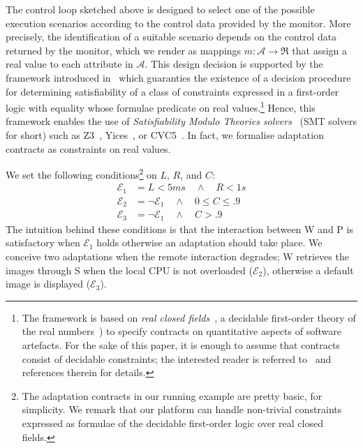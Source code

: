 The control loop sketched above is designed to select one of the
possible execution scenarios according to the control data provided by
the monitor.
%
More precisely, the identification of a suitable scenario depends on the
control data returned by the monitor, which we render as
mappings $m : \mathcal{A} \to \Re$ that assign a real value to each
attribute in $\mathcal A$.
%
%
This design decision is supported by the framework introduced
in~\cite{lopezpombo:tcs-1043,lopezpombo:ictac23} which guaranties the
existence of a decision procedure for determining satisfiability of a
class of constraints expressed in a first-order logic with
equality whose formulae predicate on real values.\footnote{%
  The framework is based on \emph{real closed fields}~\cite{tarski51},
  a decidable first-order theory of the real
  numbers~\cite[Theorem~37]{tarski51}) to specify contracts on
  quantitative aspects of software artefacts.
  For the sake of this paper, it is enough to assume that contracts
  consist of decidable constraints; the interested reader is referred
  to~\cite{lopezpombo:tcs-1043,lopezpombo:ictac23} and references
  therein for details.
}
%
Hence, this framework enables the use of \emph{Satisfiability Modulo
  Theories solvers}~\cite{biere21} (SMT solvers for short) such as
Z3~\cite{demoura:tacas08}, Yices~\cite{dutertre:cav14}, or
CVC5~\cite{barbosa:tacas22}.
% 
In fact, we formalise adaptation contracts as constraints on real
values.
%
\begin{example}\label{exe:contract}
We set the following conditions\footnote{%
  The adaptation contracts in our running example are pretty basic,
  for simplicity.
  We remark that our platform can handle non-trivial constraints
  expressed as formulae of the decidable first-order logic over real
  closed fields.
} on $L$, $R$, and $C$:
\begin{align*}
  \mathcal{E}_1 & = L < 5ms \quad \land \quad R < 1s
  \\
  \mathcal{E}_2 & = \neg \mathcal{E}_1 \quad \land \quad 0 \leq C \leq .9
  \\
  \mathcal{E}_3 & = \neg \mathcal{E}_1 \quad \land \quad C > .9
\end{align*}
%
The intuition behind these conditions is that the interaction between
\srv W and \srv P is satisfactory when $\mathcal{E}_1$ holds otherwise
an adaptation should take place.
%
We conceive two adaptations when the remote interaction degrades; \srv
W retrieves the images through \srv S when the local CPU is not
overloaded ($\mathcal{E}_2$), otherwise a default image is displayed
($\mathcal{E}_3$).
\finex
\end{example}


